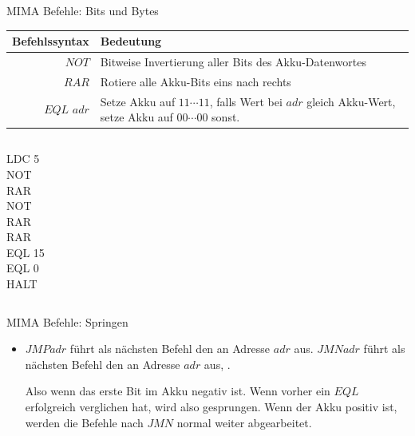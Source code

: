 \begin{frame}{MIMA Befehle: Bits und Bytes }
	\begin{tabular}{r | p{8cm} }
		Befehlssyntax & Bedeutung\\\hline\hline 
		$NOT$ & Bitweise Invertierung aller Bits des Akku-Datenwortes\\\hline
		$RAR$ & Rotiere alle Akku-Bits eins nach rechts\\\hline
		$EQL$ $adr$ & Setze Akku auf $11\cdots11$, falls Wert bei $adr$ gleich Akku-Wert, setze Akku auf $00\cdots00$ sonst.\\\hline
	\end{tabular}
	
	\bp 
	\vspace{.5cm}
	\vspace{.2cm}
	
	\begin{columns}
		\begin{column}{0.5\textwidth}
			LDC 5 \\ NOT \\ RAR \\ NOT \\ RAR \\ RAR \\ EQL 15 \\ EQL 0 \\ HALT
		\end{column}
		
		\begin{column}{0.5\textwidth}
		\end{column}
	\end{columns}
\end{frame}

\begin{frame}{MIMA Befehle: Springen}
	\begin{itemize}
		\pitem Normalerweise wird die Instruktionsadresse nach jedem Befehl um eins erhöht
		\pitem Also Befehle werden von oben nach unten abgearbeitet
		\pitem Mit Sprüngen kann man die MIMA zwingen, zu definiertem Befehl zu springen und damit die Vorgehensreihenfolge zu beeinflussen
		
		\vspace{.3cm} \bp
		
		\item $JMP adr$ führt als nächsten Befehl den an Adresse $adr$ aus.
		\pitem $JMN adr$ führt als nächsten Befehl den an Adresse $adr$ aus, .
		\begin{itemize}
			\pitem Also wenn das erste Bit im Akku negativ ist.
			\pitem Wenn vorher ein $EQL$ erfolgreich verglichen hat, wird also gesprungen.
			\pitem Wenn der Akku positiv ist, werden die Befehle nach $JMN$ normal weiter abgearbeitet.
		\end{itemize}
	\end{itemize}
\end{frame}
	
